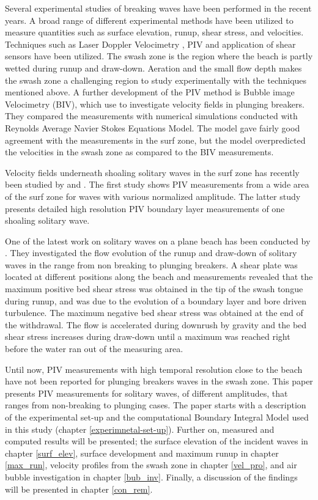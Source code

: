 \documentclass[review, authoryear]{elsarticle}
\begin{document}
 Several experimental studies of breaking waves have been performed in the recent years. A broad range of different experimental methods have been utilized to measure quantities such as surface elevation, runup, shear stress, and velocities. Techniques such as Laser Doppler Velocimetry \citep{petti01}, PIV \citep{cowen03} and application of shear sensors \citep{Barnes09}  have been utilized. The swash zone is  the region where the beach is partly wetted during runup and draw-down. Aeration and the 
small flow depth makes the swash zone a challenging region to study experimentally with the techniques mentioned above. A further development of the PIV method is Bubble image Velocimetry (BIV), which \cite{rivillas2012estimation} use to investigate velocity fields in plunging breakers. They compared the measurements with numerical simulations conducted with Reynolds Average Navier Stokes Equations Model. The   model gave fairly good agreement with the measurements in the surf zone, but the model overpredicted the velocities in the swash zone as compared to the BIV measurements.

Velocity fields underneath shoaling solitary waves in the surf zone has recently been studied by \cite{lin2014prebreaking} and \cite{lin2015study}. The first study shows PIV measurements from a wide area of the surf zone for waves with various normalized amplitude. The latter study presents detailed high resolution PIV boundary layer measurements of one shoaling solitary wave. 

One of the latest work on solitary waves on a plane beach has been conducted by \cite{pujara2015experimental}. They investigated the flow evolution of the runup and draw-down of solitary waves in the range from non breaking to plunging breakers. A shear plate was located at different positions along the beach and measurements revealed that the maximum positive bed shear stress was obtained in the tip of the swash tongue during runup,  and was due to the evolution of a boundary layer and  bore driven turbulence. The maximum negative bed shear stress was obtained at the end of the withdrawal. The flow is accelerated during downrush by gravity and the bed shear stress increases during draw-down until a maximum was reached right before the water ran out of the measuring area. 


Until now, PIV measurements with high temporal resolution close to the beach 
have not been reported for plunging breakers waves in the swash zone. 
This paper 
presents PIV measurements for solitary waves, of different amplitudes, that 
ranges from non-breaking to plunging cases. The paper starts with a description of the experimental set-up
 and the computational Boundary Integral Model used in this study (chapter \ref{experimnetal-set-up}). Further on,  measured and computed results will be presented; the surface elevation of the incident waves in chapter \ref{surf_elev}, surface development and maximum runup in chapter \ref{max_run}, velocity profiles from the swash zone in chapter \ref{vel_pro}, and air bubble investigation in chapter \ref{bub_inv}. Finally, a discussion of the findings will be presented in chapter \ref{con_rem}.
\end{document}
